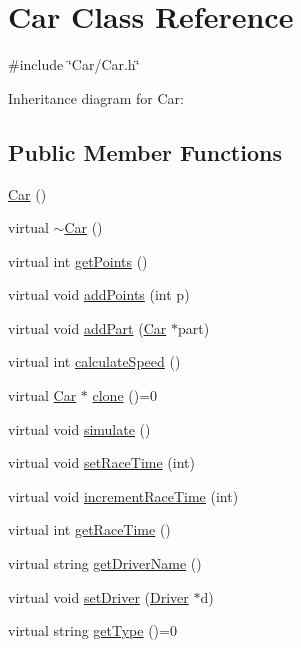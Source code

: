 \hypertarget{classCar}{}\section{Car Class Reference}
\label{classCar}


{\ttfamily \#include \char`\"{}Car/\+Car.\+h\char`\"{}}



Inheritance diagram for Car\+:
\subsection*{Public Member Functions}
\begin{DoxyCompactItemize}
\item 
\hyperlink{classCar_a1c803f7c5038d3e31b368b0d0a35493c}{Car} ()
\item 
virtual \hyperlink{classCar_a5933bb06e96b159fe339a128abda888a}{$\sim$\+Car} ()
\item 
virtual int \hyperlink{classCar_a0e0b71dc2b09be094ffb08e5b73c8ea2}{get\+Points} ()
\item 
virtual void \hyperlink{classCar_a946872fcdb7625c343e5caf90fa39617}{add\+Points} (int p)
\item 
virtual void \hyperlink{classCar_a97c6c4d86fd756e496871bda0651c5c6}{add\+Part} (\hyperlink{classCar}{Car} $\ast$part)
\item 
virtual int \hyperlink{classCar_aadb72568edbdf571547ec48e9781237f}{calculate\+Speed} ()
\item 
virtual \hyperlink{classCar}{Car} $\ast$ \hyperlink{classCar_a5a54bbfe8e72022f4d9fdf6ecc990d99}{clone} ()=0
\item 
virtual void \hyperlink{classCar_af2532d9bbcda730f936f9633d8ee8d71}{simulate} ()
\item 
virtual void \hyperlink{classCar_a72a79de673e860c1f177791bee87c529}{set\+Race\+Time} (int)
\item 
virtual void \hyperlink{classCar_a3944276e317e680a756ac58e7bac6e6f}{increment\+Race\+Time} (int)
\item 
virtual int \hyperlink{classCar_ac30e13eba209c1ca3bba99bf6741094a}{get\+Race\+Time} ()
\item 
virtual string \hyperlink{classCar_a0192991111c42f7cba809cc9831cd5f3}{get\+Driver\+Name} ()
\item 
virtual void \hyperlink{classCar_ad7148bd1abe107ce2e2b134f78582c9d}{set\+Driver} (\hyperlink{classDriver}{Driver} $\ast$d)
\item 
virtual string \hyperlink{classCar_ae502eb1c04753317ebdb759497fd030c}{get\+Type} ()=0

\end{DoxyCompactItemize}
